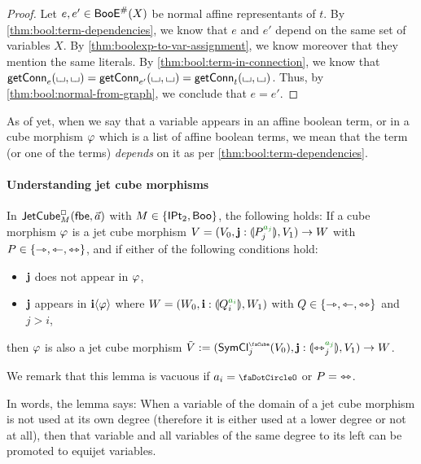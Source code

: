 \documentclass[a4paper]{memoir}
\begin{document}
\begin{proof}
	Let $e, e' \in \mathsf{BooE}^\#(X)$ be normal affine representants of $t$.
	By \cref{thm:bool:term-dependencies}, we know that $e$ and $e'$ depend on the same set of variables $X$.
	By \cref{thm:boolexp-to-var-assignment}, we know moreover that they mention the same literals.
	By \cref{thm:bool:term-in-connection}, we know that $\mathsf{getConn}_{e}({\llcorner\hspace{-.4ex}\lrcorner}, {\llcorner\hspace{-.4ex}\lrcorner}) = \mathsf{getConn}_{e'}({\llcorner\hspace{-.4ex}\lrcorner}, {\llcorner\hspace{-.4ex}\lrcorner}) = \mathsf{getConn}_{t}({\llcorner\hspace{-.4ex}\lrcorner}, {\llcorner\hspace{-.4ex}\lrcorner})$.
	Thus, by \cref{thm:bool:normal-from-graph}, we conclude that $e = e'$.
\end{proof}

As of yet, when we say that a variable appears in an affine boolean term, or in a cube morphism $\varphi$ which is a list of affine boolean terms, we mean that the term (or one of the terms) \emph{depends} on it as per \cref{thm:bool:term-dependencies}.

\paragraph{Understanding jet cube morphisms}
\begin{lemma} \label{thm:left-of-concursor}
	In $\mathsf{JetCube}^{\Box}_{M}({\mathsf{fbe}},\vec a)$ with $M \in \mathopen{}\left\{ {\mathsf{IPt}_2}, \mathsf{Boo} \right\}\mathclose{}$,
	the following holds:
	If a cube morphism $\varphi$ is a jet cube morphism $V = (V_0, \dm j : \rival{P_j\pmr{a_j}}, V_1) \to W$ with $P \in \mathopen{}\left\{ \rightarrowtriangle, \leftarrowtriangle, \leftrightarrowtriangle \right\}\mathclose{}$,
	and if either of the following conditions hold:
	\begin{itemize}
		\item $\mathbf{j}$ does not appear in $\varphi$,
		\item $\mathbf{j}$ appears in $\mathbf{i} \langle \varphi \rangle$ where $W = (W_0, \dm i : \rival{Q_i\pmr{a_i}}, W_1)$ with $Q \in \mathopen{}\left\{ \rightarrowtriangle, \leftarrowtriangle, \leftrightarrowtriangle \right\}\mathclose{}$ and $j > i$,
	\end{itemize}
	then $\varphi$ is also a jet cube morphism
	$\tilde V := (\UFsymcube_j(V_0), \dm j : \rival{\equijet_j\pmr{a_j}}, V_1) \to W$.
\end{lemma}
We remark that this lemma is vacuous if $a_i = \npolar$ or $P = {\leftrightarrowtriangle}$.

In words, the lemma says: When a variable of the domain of a jet cube morphism is not used at its own degree (therefore it is either used at a lower degree or not at all), then that variable and all variables of the same degree to its left can be promoted to equijet variables.
\end{document}
